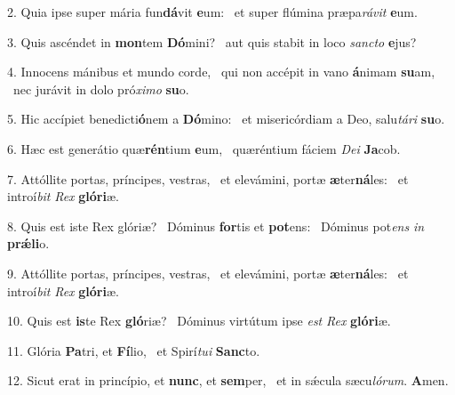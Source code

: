 2. Quia ipse super mária fun\textbf{dá}vit \textbf{e}um: \ast\  et super flúmina præpa\textit{rá}\textit{vit} \textbf{e}um.\

3. Quis ascéndet in \textbf{mon}tem \textbf{Dó}mini? \ast\  aut quis stabit in loco \textit{sanc}\textit{to} \textbf{e}jus?\

4. Innocens mánibus et mundo corde, \dag\  qui non accépit in vano \textbf{á}nimam \textbf{su}am, \ast\  nec jurávit in dolo pró\textit{xi}\textit{mo} \textbf{su}o.\

5. Hic accípiet benedicti\textbf{ó}nem a \textbf{Dó}mino: \ast\  et misericórdiam a Deo, salu\textit{tá}\textit{ri} \textbf{su}o.\

6. Hæc est generátio quæ\textbf{rén}tium \textbf{e}um, \ast\  quæréntium fáciem \textit{De}\textit{i} \textbf{Ja}cob.\

7. Attóllite portas, príncipes, vestras, \dag\  et elevámini, portæ \textbf{æ}ter\textbf{ná}les: \ast\  et introí\textit{bit} \textit{Rex} \textbf{gló}\textbf{ri}æ.\

8. Quis est iste Rex glóriæ? \dag\  Dóminus \textbf{for}tis et \textbf{pot}ens: \ast\  Dóminus pot\textit{ens} \textit{in} \textbf{prǽ}\textbf{li}o.\

9. Attóllite portas, príncipes, vestras, \dag\  et elevámini, portæ \textbf{æ}ter\textbf{ná}les: \ast\  et introí\textit{bit} \textit{Rex} \textbf{gló}\textbf{ri}æ.\

10. Quis est \textbf{is}te Rex \textbf{gló}riæ? \ast\  Dóminus virtútum ipse \textit{est} \textit{Rex} \textbf{gló}\textbf{ri}æ.\

11. Glória \textbf{Pa}tri, et \textbf{Fí}lio, \ast\  et Spirí\textit{tu}\textit{i} \textbf{Sanc}to.\

12. Sicut erat in princípio, et \textbf{nunc}, et \textbf{sem}per, \ast\  et in sǽcula sæcu\textit{ló}\textit{rum}. \textbf{A}men.\

